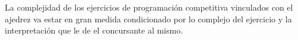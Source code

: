 La complejidad de los ejercicios de programación competitiva vinculados con el ajedrez va estar en gran medida condicionado por lo complejo del ejercicio y la interpretación que le de el concursante al mismo.